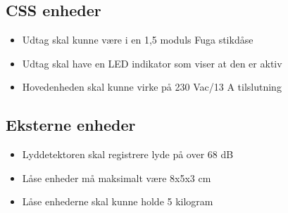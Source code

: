 \subsection*{CSS enheder}
\begin{itemize}
\item Udtag skal kunne være i en 1,5 moduls Fuga stikdåse
\item Udtag skal have en LED indikator som viser at den er aktiv
\item Hovedenheden skal kunne virke på 230 Vac/13 A tilslutning
\end{itemize}

\subsection*{Eksterne enheder}
\begin{itemize}
\item Lyddetektoren skal registrere lyde på over 68 dB
\item Låse enheder må maksimalt være 8x5x3 cm
\item Låse enhederne skal kunne holde 5 kilogram
\end{itemize}
